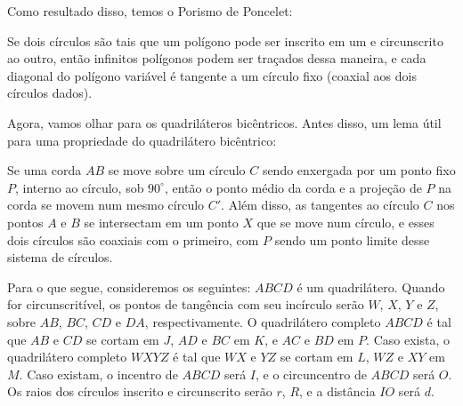\documentclass[10pt, a4paper]{article}
\begin{document}
Como resultado disso, temos o Porismo de Poncelet:

	\begin{prob}
		Se dois círculos são tais que um polígono pode ser inscrito em um e circunscrito ao outro, então infinitos polígonos podem ser traçados dessa maneira, e cada diagonal do polígono variável é tangente a um círculo fixo (coaxial aos dois círculos dados).
	\end{prob}

Agora, vamos olhar para os quadriláteros bicêntricos. Antes disso, um lema útil para uma propriedade do quadrilátero bicêntrico:

	\begin{lem}
		Se uma corda $AB$ se move sobre um círculo $C$ sendo enxergada por um ponto fixo $P$, interno ao círculo, sob $90^\circ$, então o ponto médio da corda e a projeção de $P$ na corda se movem num mesmo círculo $C'$. Além disso, as tangentes ao círculo $C$ nos pontos $A$ e $B$ se intersectam em um ponto $X$ que se move num círculo, e esses dois círculos são coaxiais com o primeiro, com $P$ sendo um ponto limite desse sistema de círculos.
	\end{lem}

	Para o que segue, consideremos os seguintes: $ABCD$ é um quadrilátero. Quando for circunscritível, os pontos de tangência com seu incírculo serão $W$, $X$, $Y$ e $Z$, sobre $AB$, $BC$, $CD$ e $DA$, respectivamente. O quadrilátero completo $ABCD$ é tal que $AB$ e $CD$ se cortam em $J$, $AD$ e $BC$ em $K$, e $AC$ e $BD$ em $P$. Caso exista, o quadrilátero completo $WXYZ$ é tal que $WX$ e $YZ$ se cortam em $L$, $WZ$ e $XY$ em $M$. Caso existam, o incentro de $ABCD$ será $I$, e o circuncentro de $ABCD$ será $O$. Os raios dos círculos inscrito e circunscrito serão $r$, $R$, e a distância $IO$ será $d$.
\end{document}
